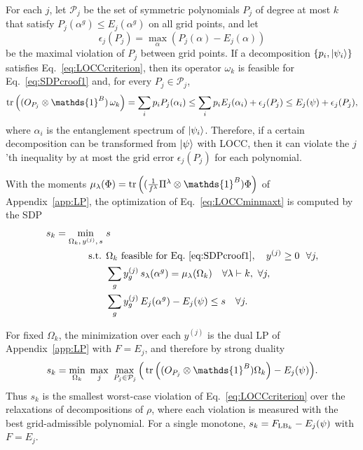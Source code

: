 \documentclass[aps,pra,onecolumn,superscriptaddress]{revtex4-2}
\newcommand{\one}{\mathds{1}}
\newcommand{\I}{\one}
\renewcommand{\a}{\alpha}
\begin{document}
\begin{widetext}
For each $j$, let $\mathcal{P}_j$ be the set of symmetric polynomials $P_j$ of degree at most $k$ that satisfy $P_j(\a^g)\leq E_j(\a^g)$ on all grid points, and let
\begin{equation}
    \epsilon_j(P_j)=\max_{\a}\left(P_j(\a)-E_j(\a)\right)
\end{equation}
be the maximal violation of $P_j$ between grid points. If a decomposition $\{p_i,\ket{\psi_i}\}$ satisfies Eq.~\eqref{eq:LOCCcriterion}, then its operator $\omega_{k}$ is feasible for Eq.~\eqref{eq:SDPcroof1} and, for every $P_j\in\mathcal{P}_j$,
\begin{equation}\label{eq:LOCCnecessary}
\tr\left((O_{P_j}\otimes\I^B)\,\omega_{k}\right)=\sum_ip_iP_j(\a_i)\leq\sum_ip_iE_j(\a_i)+\epsilon_j(P_j)\leq E_j(\psi)+\epsilon_j(P_j),
\end{equation}
where $\a_i$ is the entanglement spectrum of $\ket{\psi_i}$. Therefore, if a certain decomposition can be transformed from $\ket{\psi}$ with LOCC, then it can violate the $j$'th inequality by at most the grid error $\epsilon_j(P_j)$ for each polynomial.

With the moments $\mu_\lambda(\Phi)=\tr\left((\tfrac{1}{f^\lambda}\Pi^\lambda\otimes\I^B)\Phi\right)$ of Appendix~\ref{app:LP}, the optimization of Eq.~\eqref{eq:LOCCminmaxt} is computed by the SDP
\begin{align}\label{eq:LOCCsdp}
    s_k=\min_{\Omega_k,\,y^{(j)},\,s}\ & s\\
    \text{s.t. }& \Omega_k\ \text{feasible for Eq.~\eqref{eq:SDPcroof1}},\quad y^{(j)}\geq0\ \ \forall j, \nonumber\\
    & \sum_g y^{(j)}_g\,s_\lambda(\a^g)=\mu_\lambda(\Omega_k)\quad\forall\lambda\vdash k,\ \forall j, \nonumber\\
    & \sum_g y^{(j)}_g\,E_j(\a^g)-E_j(\psi)\leq s\quad\forall j. \nonumber
\end{align}

For fixed $\Omega_k$, the minimization over each $y^{(j)}$ is the dual LP of Appendix~\ref{app:LP} with $F=E_j$, and therefore by strong duality
\begin{equation}\label{eq:LOCCminmax}
    s_k=\min_{\Omega_k}\ \max_{j}\ \max_{P_j\in\mathcal{P}_j}\Big(\tr\left((O_{P_j}\otimes\I^B) \Omega_k\right)-E_j(\psi)\Big).
\end{equation}
Thus $s_k$ is the smallest worst-case violation of Eq.~\eqref{eq:LOCCcriterion} over the relaxations of decompositions of $\rho$, where each violation is measured with the best grid-admissible polynomial. For a single monotone, $s_k=F_{{\rm LB}_k}-E_j(\psi)$ with $F=E_j$.


\end{widetext}
\end{document}
